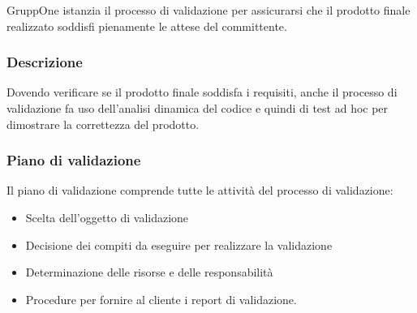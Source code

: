\documentclass[../norme-di-progetto.tex]{subfiles}
\begin{document}
GruppOne istanzia il processo di validazione per assicurarsi che il prodotto finale realizzato soddisfi pienamente le attese del committente.

\subsubsection{Descrizione}%
\label{subs:validazione/descrizione}

Dovendo verificare se il prodotto finale soddisfa i requisiti, anche il processo di validazione fa uso dell'analisi dinamica del codice e quindi di test ad hoc per dimostrare la correttezza del prodotto.

\subsubsection{Piano di validazione}%
\label{subs:piano_di_validazione}

Il piano di validazione comprende tutte le attività del processo di validazione:

\begin{itemize}
  \item Scelta dell'oggetto di validazione
  \item Decisione dei compiti da eseguire per realizzare la validazione
  \item Determinazione delle risorse e delle responsabilità
  \item Procedure per fornire al cliente i report di validazione.
\end{itemize}
\end{document}
